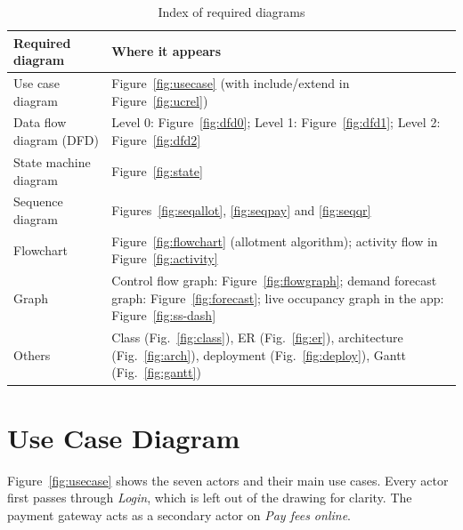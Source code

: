 \documentclass[11pt,a4paper]{report}
\begin{document}
\begin{table}[H]
\centering\small
\caption{Index of required diagrams}\label{tab:diagidx}
\begin{tabularx}{\textwidth}{lL}
\toprule
\textbf{Required diagram} & \textbf{Where it appears}\\
\midrule
Use case diagram & Figure~\ref{fig:usecase} (with include/extend in Figure~\ref{fig:ucrel})\\
Data flow diagram (DFD) & Level 0: Figure~\ref{fig:dfd0}; Level 1: Figure~\ref{fig:dfd1}; Level 2: Figure~\ref{fig:dfd2}\\
State machine diagram & Figure~\ref{fig:state}\\
Sequence diagram & Figures~\ref{fig:seqallot}, \ref{fig:seqpay} and \ref{fig:seqqr}\\
Flowchart & Figure~\ref{fig:flowchart} (allotment algorithm); activity flow in Figure~\ref{fig:activity}\\
Graph & Control flow graph: Figure~\ref{fig:flowgraph}; demand forecast graph: Figure~\ref{fig:forecast}; live occupancy graph in the app: Figure~\ref{fig:ss-dash}\\
Others & Class (Fig.~\ref{fig:class}), ER (Fig.~\ref{fig:er}), architecture (Fig.~\ref{fig:arch}), deployment (Fig.~\ref{fig:deploy}), Gantt (Fig.~\ref{fig:gantt})\\
\bottomrule
\end{tabularx}
\end{table}

\section{Use Case Diagram}
Figure~\ref{fig:usecase} shows the seven actors and their main use cases. Every actor first passes through \emph{Login}, which is left out of the drawing for clarity. The payment gateway acts as a secondary actor on \emph{Pay fees online}.
\end{document}
